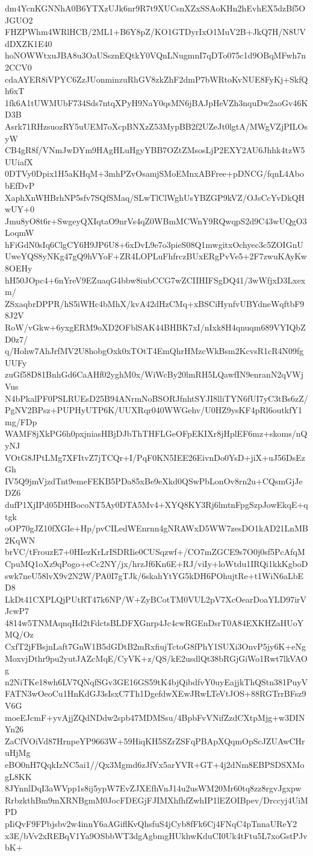 dm4YcnKGNNhA0B6YTXzUJk6nr9R7t9XUCsnXZxSSAoKHn2hEvhEX5dzBf5OJGUO2
FHZPWhm4WRlHCB/2ML1+B6Y8pZ/KO1GTDyrIxO1MuV2B+JkQ7H/N8UVdDXZK1E40
hoNOWWtxuJBA8u3OaUSsznEQtkY0VQnLNugmnI7qDTo075c1d9OBqMFwh7n2CCV0
cdaAYER8iVPYC6ZzJUonminzuRhGV8zkZhF2dmP7bWRtoKvNUE8FyKj+SkfQh6xT
1fk6A1tUWMUbF734Sds7ntqXPyH9NaY0qsMN6jBAJpHeVZh3nquDw2aoGv46KD3B
Asrk71RHzsuozRY5uUEM7oXcpBNXzZ53MypBB2f2UZeJt0lgtA/MWgVZjPILOsyW
CB4gR8f/VNmJwDYm9HAgHLuHgyYBB7OZtZMsosLjP2EXY2AU6Jhhk4tzW5UUiafX
0DTVy0Dpix1H5aKHqM+3mhPZvOsamjSMoEMnxABFree+pDNCG/fqnL4AbobEfDvP
XaphXnWHBrhNP5sfv7SQfSMaq/SLwTlClWghUsYBZGP9kVZ/OJsCcYvDkQHwUY+0
Jmu8yO8t6r+SwgeyQXIqtaO9nrVs4qZ0WBmMCWnY9RQwqpS2d9C43wUQgO3LoqmW
hFiGdN0sIq6ClgCY6H9JP6U8+6xDvL9e7o3pieS08Q1mwgitxOchyec3c5ZOIGnU
UweYQS8yNKg47gQ9hVYoF+ZR4LOPLuFhfrczBUxERgPvVe5+2F7zwuKAyKw8OEHy
hH50JOpc4+6nYreV9EZuaqG4bbw8iubCCG7wZCIIHIFSgDQ41/3wWfjxD3Lxexm/
ZSxaqbrDPPR/hS5iWHc4bMhX/kvA42dHzCMq+xBSCiHynfvUBYdneWqftbF98J2V
RoW/vGkw+6yxgERM9oXD2OFblSAK44BHBK7xI/nIxk8H4qnuqm689VYIQbZD0z7/
q/Hohw7AhJrfMV2U8hobgOxk0xTOtT4EmQhrHMzcWkBsm2KcvsR1cR4N09fgUUFy
zuGf58D81BnhGd6CaAHf02yghM0x/WiWcBy20lmRH5LQawfIN9enranN2qVWjVus
N4bPkalPF0PSLRUEsD25B94ANrmNoBSORJfnhtSYJI8lliTYN6fUI7yC3tBs6zZ/
PgNV2BPsz+PUPHyUTP6K/UUXRqr040WWGehv/U0HZ9ysKF4pRl6outkfY1mg/FDp
WAMF8jXkPG6h0pxjniasHBjDJbThTHFLGeOFpEKIXr8jHplEF6mz+skoms/nQyNJ
VOtG8JPtLMg7XFItvZ7jTCQr+I/PqF0KN5IEE26EivnDo0YsD+jiX+uJ56DsEzGh
IV5Q9jmVjzdTnt9emeFEKB5PDa85xBe9eXkd0QSwPbLonOv8rn2u+CQsmGjJeDZ6
dufP1XjIPd05DHBocoNT5Ay0DTA5Mv4+XYQ8KY3Rj6lmtnFpgSzpJowEkqE+qtgk
oOP70gJZ10fXGIe+Hp/pvCILedWEnrnn4gNRAWxD5WW7zesDO1kAD21LnMB2KqWN
brVC/tFrouzE7+0HIezKrLrISDRIie0CUSqzwf+/CO7mZGCE9s7O0j0sf5PcAfqM
CpuMQ1oXz9qPogo+eCc2NY/jx/hrzJf6Kn6E+RJ/viIy+loWtdu1IRQi1kkKgboD
swk7neU58lvX9v2N2W/PA0I7gTJk/6skahYtYG5kDH6POhujtRe+t1WiN6aLbED8
LkDt41CXPLQjPUtRT47k6NP/W+ZyBCotTM0VUL2pV7XcOearDoaYLD97irVJcwP7
4814w5TNMAqnqHd2tFdctsBLDFXGnrp4Jc4cwRGEnDsrT0A84EXKHZaHUoYMQ/Oz
CxfT2jFBsjnLaft7GnW1B5dGDtB2mRxfiujTctoG8fPhY1SUXi3OnvP5jy6K+eNg
MoxvjDthr9pu2yutJAZcMqE/CyVK+z/QS/kE2usdlQt38bRGjGiWo1Rwt7lkVAOg
n2NiTKe18wh6LV7QNqfSGv3GE16GS59tK4bjQibdfvY0uyEajjkThQStn381PuyV
FATN3wOeoCu1HnKdGJ3sIsxC7Th1DgefdwXEwJRwLTeVtJOS+88RGTrrBFsz9V6G
moeEJcmF+yvAjjZQdNDdw2spb47MDMSsu/4BpbFvVNifZzdCXtpMjg+w3DINYn26
ZaCfVOiVd87HrnpeYP9663W+59HiqKH5SZrZSFqPBApXQqmOpScJZUAwCHruHjMg
eBO0nH7QqkIzNC5ai1//Qx3Mgmd6zJfVx5arYVR+GT+4j2dNm8EBPSDSXMogL8KK
8JYnnlDqI3aWVpp1s8ij5ypW7EvZJXEfhVnJ14u2usWM20Mr60tq8zz8rgvJgxpw
RrbzkthBm9mXRNBgmM0JocFDEGjFJIMXhfhfZwhIP1lEZOIBpev/Drccyj4UiMPD
pIiQvF9FPbjsbv2w4innY6aAGiflKvQhsfuS4jCyb8fFk6Cj4FNqC4pTnnaUReY2
x3E/bVv2xREBqV1Ya9OSbbWT3dgAgbmgHUkhwKduCI0Uk4tFtu5L7xoGstPJvbK+
